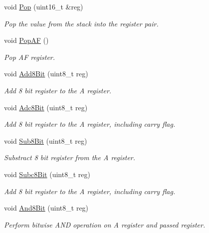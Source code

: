 \begin{DoxyCompactItemize}
void \mbox{\hyperlink{classCPU_ab02cadc2eb9ff01c7132acef7ac5e4c3}{Pop}} (uint16\+\_\+t \&reg)
\begin{DoxyCompactList}\small\item\em Pop the value from the stack into the register pair. \end{DoxyCompactList}\item 
\mbox{\label{classCPU_a1942f39a9cd6ac68a30afbcece8c8e60}} 
void \mbox{\hyperlink{classCPU_a1942f39a9cd6ac68a30afbcece8c8e60}{Pop\+AF}} ()
\begin{DoxyCompactList}\small\item\em Pop AF register. \end{DoxyCompactList}\item 
void \mbox{\hyperlink{classCPU_ab0be615e4d0440a927b3e3a95e378d3a}{Add8\+Bit}} (uint8\+\_\+t reg)
\begin{DoxyCompactList}\small\item\em Add 8 bit register to the A register. \end{DoxyCompactList}\item 
void \mbox{\hyperlink{classCPU_a1ce2b87612cd02f3de675029d5ce436a}{Adc8\+Bit}} (uint8\+\_\+t reg)
\begin{DoxyCompactList}\small\item\em Add 8 bit register to the A register, including carry flag. \end{DoxyCompactList}\item 
void \mbox{\hyperlink{classCPU_af7bbabba611a2d769b00858254d80dd2}{Sub8\+Bit}} (uint8\+\_\+t reg)
\begin{DoxyCompactList}\small\item\em Substract 8 bit register from the A register. \end{DoxyCompactList}\item 
void \mbox{\hyperlink{classCPU_a601e1531c26346cd5e6ac82f57617e6e}{Subc8\+Bit}} (uint8\+\_\+t reg)
\begin{DoxyCompactList}\small\item\em Add 8 bit register to the A register, including carry flag. \end{DoxyCompactList}\item 
void \mbox{\hyperlink{classCPU_a32632ab16ca2244110c9b732c3277851}{And8\+Bit}} (uint8\+\_\+t reg)
\begin{DoxyCompactList}\small\item\em Perform bitwise A\+ND operation on A register and passed register. \end{DoxyCompactList}\item 

\end{DoxyCompactItemize}
